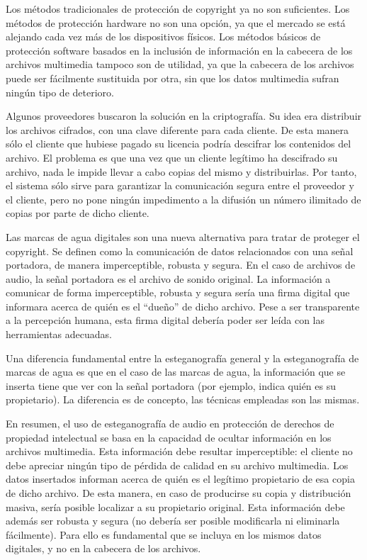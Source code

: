 \documentclass[12pt]{article}
\begin{document}
Los métodos tradicionales de protección de copyright ya no son suficientes. Los métodos de protección hardware no son una opción, ya que el mercado se está alejando cada vez más de los dispositivos físicos. Los métodos básicos de protección software basados en la inclusión de información en la cabecera de los archivos multimedia tampoco son de utilidad, ya que la cabecera de los archivos puede ser fácilmente sustituida por otra, sin que los datos multimedia sufran ningún tipo de deterioro.

Algunos proveedores buscaron la solución en la criptografía. Su idea era distribuir los archivos cifrados, con una clave diferente para cada cliente. De esta manera sólo el cliente que hubiese pagado su licencia podría descifrar los contenidos del archivo. El problema es que una vez que un cliente legítimo ha descifrado su archivo, nada le impide llevar a cabo copias del mismo y distribuirlas. Por tanto, el sistema sólo sirve para garantizar la comunicación segura entre el proveedor y el cliente, pero no pone ningún impedimento a la difusión un número ilimitado de copias por parte de dicho cliente.

Las marcas de agua digitales son una nueva alternativa para tratar de proteger el copyright. Se definen como la comunicación de datos relacionados con una señal portadora, de manera imperceptible, robusta y segura. En el caso de archivos de audio, la señal portadora es el archivo de sonido original. La información a comunicar de forma imperceptible, robusta y segura sería una firma digital que informara acerca de quién es el ``dueño'' de dicho archivo. Pese a ser transparente a la percepción humana, esta firma digital debería poder ser leída con las herramientas adecuadas.

Una diferencia fundamental entre la esteganografía general y la esteganografía de marcas de agua es que en el caso de las marcas de agua, la información que se inserta tiene que ver con la señal portadora (por ejemplo, indica quién es su propietario). La diferencia es de concepto, las técnicas empleadas son las mismas.

En resumen, el uso de esteganografía de audio en protección de derechos de propiedad intelectual se basa en la capacidad de ocultar información en los archivos multimedia. Esta información debe resultar imperceptible: el cliente no debe apreciar ningún tipo de pérdida de calidad en su archivo multimedia. Los datos insertados informan acerca de quién es el legítimo propietario de esa copia de dicho archivo. De esta manera, en caso de producirse su copia y distribución masiva, sería posible localizar a su propietario original. Esta información debe además ser robusta y segura (no debería ser posible modificarla ni eliminarla fácilmente). Para ello es fundamental que se incluya en los mismos datos digitales, y no en la cabecera de los archivos.
\end{document}
